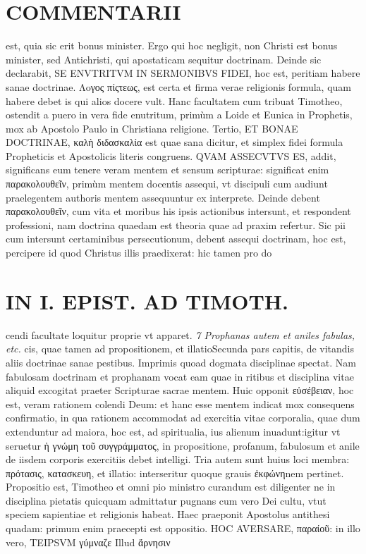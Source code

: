 \documentclass{article}
\begin{document}
\begin{pages}
\section*{COMMENTARII }
\marginpar{[ p.94 ]}\pstart est, quia sic erit bonus minister. Ergo qui hoc negligit, non Christi est bonus minister, sed Antichristi, qui apostaticam sequitur doctrinam. Deinde sic declarabit, SE ENVTRITVM IN SERMONIBVS FIDEI, hoc est, peritiam habere sanae doctrinae. Λoγος πίςτεως, est certa et firma verae religionis formula, quam habere debet is qui alios docere vult. Hanc facultatem cum tribuat Timotheo, ostendit a puero in vera fide enutritum, primùm a Loide et Eunica in Prophetis, mox ab Apostolo Paulo in Christiana religione.  \pend\pstart Tertio, ET BONAE DOCTRINAE, καλὴ διδασκαλία est quae sana dicitur, et simplex fidei formula Propheticis et Apostolicis literis congruens. QVAM ASSECVTVS ES, addit, significans eum tenere veram mentem et sensum scripturae: significat enim παρακολουθεῖν, primùm mentem docentis assequi, vt discipuli cum audiunt praelegentem authoris mentem assequuntur ex interprete. Deinde debent παρακολουθεῖν, cum vita et moribus  his ipsis actionibus intersunt, et respondent professioni, nam doctrina quaedam est theoria quae ad praxim refertur. Sic pii cum intersunt certaminibus persecutionum, debent assequi doctrinam, hoc est, percipere id quod Christus illis praedixerat: hic tamen pro do\pend
\section*{IN I. EPIST. AD TIMOTH. }
\marginpar{[ p.95 ]}\pstart cendi facultate loquitur proprie vt apparet.  \pend
\textit{7 Prophanas autem et aniles fabulas, etc. }\pstart cis, quae tamen ad propositionem, et illatioSecunda pars capitis, de vitandis aliis doctrinae sanae pestibus. Imprimis quoad dogmata disciplinae spectat. Nam fabulosam doctrinam et prophanam vocat eam quae in ritibus et disciplina vitae aliquid excogitat praeter Scripturae sacrae mentem. Huic opponit εὐσέβειαν, hoc est, veram rationem colendi Deum: et hanc esse mentem indicat mox consequens confirmatio, in qua rationem accommodat ad exercitia vitae corporalia, quae dum extenduntur ad maiora, hoc est, ad spiritualia, ius alienum inuadunt:igitur vt seruetur ἡ γνώμη τοῦ συγγράμματος, in propositione, profanum, fabulosum et anile de iisdem corporis exercitiis debet intelligi. Tria autem sunt huius loci membra: πρότασις, κατασκευη, et illatio: interseritur quoque grauis ἐκφώνηnem pertinet.  \pend\pstart Propositio est, Timotheo et omni pio ministro curandum est diligenter ne in disciplina pietatis quicquam admittatur pugnans cum vero Dei cultu, vtut speciem sapientiae et religionis habeat. Haec praeponit Apostolus antithesi quadam: primum enim praecepti est oppositio. HOC AVERSARE, παραίοῦ: in illo vero, TEIPSVM γύμναζε Illud ἄρνησιν  \pend

\end{pages}
\end{document}
